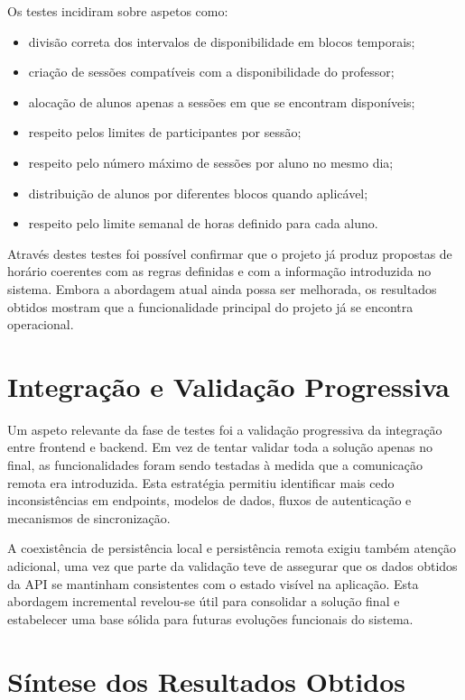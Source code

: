 Os testes incidiram sobre aspetos como:
\begin{itemize}
    \item divisão correta dos intervalos de disponibilidade em blocos temporais;
    \item criação de sessões compatíveis com a disponibilidade do professor;
    \item alocação de alunos apenas a sessões em que se encontram disponíveis;
    \item respeito pelos limites de participantes por sessão;
    \item respeito pelo número máximo de sessões por aluno no mesmo dia;
    \item distribuição de alunos por diferentes blocos quando aplicável;
    \item respeito pelo limite semanal de horas definido para cada aluno.
\end{itemize}

Através destes testes foi possível confirmar que o projeto já produz propostas de horário coerentes com as regras definidas e com a informação introduzida no sistema.
Embora a abordagem atual ainda possa ser melhorada, os resultados obtidos mostram que a funcionalidade principal do projeto já se encontra operacional.

\section{Integração e Validação Progressiva}

Um aspeto relevante da fase de testes foi a validação progressiva da integração entre frontend e backend. Em vez de tentar validar toda a solução apenas no final,
as funcionalidades foram sendo testadas à medida que a comunicação remota era introduzida.
Esta estratégia permitiu identificar mais cedo inconsistências em endpoints, modelos de dados, fluxos de autenticação e mecanismos de sincronização.

A coexistência de persistência local e persistência remota exigiu também atenção adicional, uma vez que parte da validação teve de assegurar que os dados obtidos da API
se mantinham consistentes com o estado visível na aplicação.
Esta abordagem incremental revelou-se útil para consolidar a solução final e estabelecer uma base sólida para futuras evoluções funcionais do sistema.

\section{Síntese dos Resultados Obtidos}

